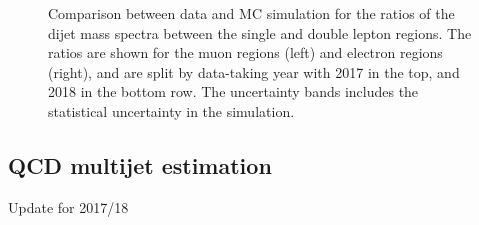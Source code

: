 \begin{figure}[htbp]
  \caption{Comparison between data and MC simulation for the ratios of the dijet mass spectra between the single and double lepton regions.
    The ratios are shown for the muon regions (left) and electron regions (right), and are split by data-taking year with 2017 in the top, and 2018 in the bottom row.
     The uncertainty bands includes the statistical uncertainty in the simulation.}
  \label{fig:Ratio}
\end{figure}


\subsection{QCD multijet estimation}
{\color{red} Update for 2017/18}
